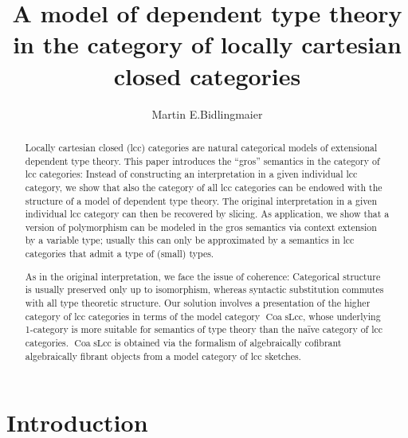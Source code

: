 \documentclass[a4paper]{article}
\theoremstyle{remark}
\theoremstyle{definition}
\begin{document}
\title{A model of dependent type theory in the category of locally cartesian closed categories}

\author{Martin E.\@ Bidlingmaier}

\maketitle

\begin{abstract}
  Locally cartesian closed (lcc) categories are natural categorical models of extensional dependent type theory.
  This paper introduces the ``gros'' semantics in the category of lcc categories:
  Instead of constructing an interpretation in a given individual lcc category, we show that also the category of all lcc categories can be endowed with the structure of a model of dependent type theory.
  The original interpretation in a given individual lcc category can then be recovered by slicing.
  As application, we show that a version of polymorphism can be modeled in the gros semantics via context extension by a variable type; usually this can only be approximated by a semantics in lcc categories that admit a type of (small) types.

  As in the original interpretation, we face the issue of coherence:
  Categorical structure is usually preserved only up to isomorphism, whereas syntactic substitution commutes with all type theoretic structure.
  Our solution involves a presentation of the higher category of lcc categories in terms of the model category $\operatorname{Coa} \mathrm{sLcc}$, whose underlying 1-category is more suitable for semantics of type theory than the naïve category of lcc categories.
  $\operatorname{Coa} \mathrm{sLcc}$ is obtained via the formalism of algebraically cofibrant algebraically fibrant objects from a model category of lcc sketches.
\end{abstract}

\section{Introduction}
\end{document}
